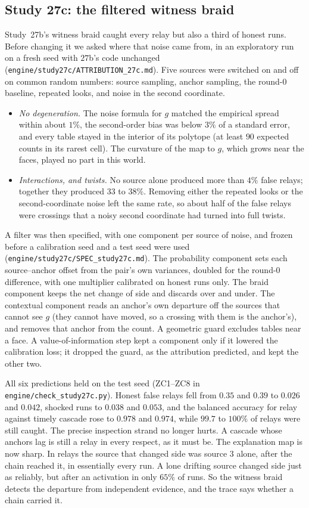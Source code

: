 \documentclass[11pt]{article}
\theoremstyle{definition}\newtheorem{definition}[theorem]{Definition}\newtheorem{remark}[theorem]{Remark}\newtheorem{example}[theorem]{Example}\newtheorem{problem}[theorem]{Open problem}\crefname{problem}{Problem}{Problems}
\begin{document}
\subsection{Study 27c: the filtered witness braid}\label{sec:study27c}
Study~27b's witness braid caught every relay but also a third of honest runs. Before changing it we asked where that noise came from, in an exploratory run on a fresh seed with $27$b's code unchanged (\texttt{engine/study27c/ATTRIBUTION\_27c.md}). Five sources were switched on and off on common random numbers: source sampling, anchor sampling, the round-$0$ baseline, repeated looks, and noise in the second coordinate.
\begin{itemize}
\item \emph{No degeneration.} The noise formula for $g$ matched the empirical spread within about $1\%$, the second-order bias was below $3\%$ of a standard error, and every table stayed in the interior of its polytope (at least $90$ expected counts in its rarest cell). The curvature of the map to $g$, which grows near the faces, played no part in this world.
\item \emph{Interactions, and twists.} No source alone produced more than $4\%$ false relays; together they produced $33$ to $38\%$. Removing either the repeated looks or the second-coordinate noise left the same rate, so about half of the false relays were crossings that a noisy second coordinate had turned into full twists.
\end{itemize}
A filter was then specified, with one component per source of noise, and frozen before a calibration seed and a test seed were used (\texttt{engine/study27c/SPEC\_study27c.md}). The probability component sets each source--anchor offset from the pair's own variances, doubled for the round-$0$ difference, with one multiplier calibrated on honest runs only. The braid component keeps the net change of side and discards over and under. The contextual component reads an anchor's own departure off the sources that cannot see $g$ (they cannot have moved, so a crossing with them is the anchor's), and removes that anchor from the count. A geometric guard excludes tables near a face. A value-of-information step kept a component only if it lowered the calibration loss; it dropped the guard, as the attribution predicted, and kept the other two.

All six predictions held on the test seed (ZC1--ZC8 in \texttt{engine/check\_study27c.py}). Honest false relays fell from $0.35$ and $0.39$ to $0.026$ and $0.042$, shocked runs to $0.038$ and $0.053$, and the balanced accuracy for relay against timely cascade rose to $0.978$ and $0.974$, while $99.7$ to $100\%$ of relays were still caught. The precise inspection strand no longer hurts. A cascade whose anchors lag is still a relay in every respect, as it must be. The explanation map is now sharp. In relays the source that changed side was source $3$ alone, after the chain reached it, in essentially every run. A lone drifting source changed side just as reliably, but after an activation in only $65\%$ of runs. So the witness braid detects the departure from independent evidence, and the trace says whether a chain carried it.
\end{document}

